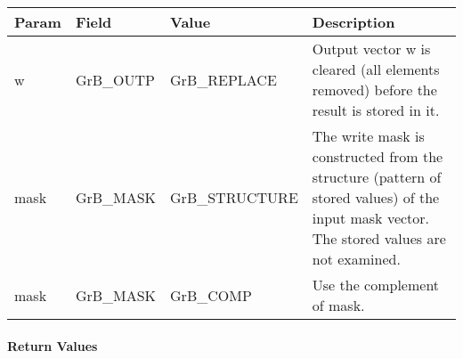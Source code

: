 \begin{itemize}[leftmargin=1.1in]
    \hspace*{-2em}\begin{tabular}{lllp{2.7in}}
        Param & Field  & Value & Description \\
        \hline
        {\sf w}    & {\sf GrB\_OUTP} & {\sf GrB\_REPLACE} & Output vector {\sf w}
        is cleared (all elements removed) before the result is stored in it.\\

        {\sf mask} & {\sf GrB\_MASK} & {\sf GrB\_STRUCTURE}   & The write mask is
        constructed from the structure (pattern of stored values) of the input
        {\sf mask} vector. The stored values are not examined.\\

        {\sf mask} & {\sf GrB\_MASK} & {\sf GrB\_COMP}   & Use the 
        complement of {\sf mask}. \\
    \end{tabular}
\end{itemize}

\paragraph{Return Values}

